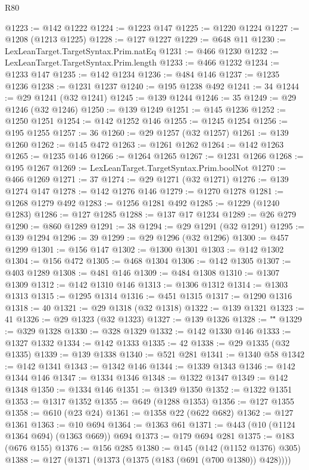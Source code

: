 \begin{lexlean}{R80}
\begin{coremodule}
@1223 := @142 @1222
@1224 := @1223 @147
@1225 := @1220 @1224
@1227 := @1208 (@1213 @1225)
@1228 := @127 @1227
@1229 := @648 @11
@1230 := LexLeanTarget.TargetSyntax.Prim.natEq
@1231 := @466 @1230
@1232 := LexLeanTarget.TargetSyntax.Prim.length
@1233 := @466 @1232
@1234 := @1233 @147
@1235 := @142 @1234
@1236 := @484 @146
@1237 := @1235 @1236
@1238 := @1231 @1237
@1240 := @195 @1238 @492
@1241 := 34
@1244 := @29 @1241 (@32 @1241)
@1245 := @139 @1244
@1246 := 35
@1249 := @29 @1246 (@32 @1246)
@1250 := @139 @1249
@1251 := @145 @1236
@1252 := @1250 @1251
@1254 := @142 @1252 @146
@1255 := @1245 @1254
@1256 := @195 @1255
@1257 := 36
@1260 := @29 @1257 (@32 @1257)
@1261 := @139 @1260
@1262 := @145 @472
@1263 := @1261 @1262
@1264 := @142 @1263
@1265 := @1235 @146
@1266 := @1264 @1265
@1267 := @1231 @1266
@1268 := @195 @1267
@1269 := LexLeanTarget.TargetSyntax.Prim.boolNot
@1270 := @466 @1269
@1271 := 37
@1274 := @29 @1271 (@32 @1271)
@1276 := @139 @1274 @147
@1278 := @142 @1276 @146
@1279 := @1270 @1278
@1281 := @1268 @1279 @492
@1283 := @1256 @1281 @492
@1285 := @1229 (@1240 @1283)
@1286 := @127 @1285
@1288 := @137 @17 @1234
@1289 := @26 @279
@1290 := @860 @1289
@1291 := 38
@1294 := @29 @1291 (@32 @1291)
@1295 := @139 @1294
@1296 := 39
@1299 := @29 @1296 (@32 @1296)
@1300 := @457 @1299
@1301 := @156 @147
@1302 := @1300 @1301
@1303 := @142 @1302
@1304 := @156 @472
@1305 := @468 @1304
@1306 := @142 @1305
@1307 := @403 @1289
@1308 := @481 @146
@1309 := @484 @1308
@1310 := @1307 @1309
@1312 := @142 @1310 @146
@1313 := @1306 @1312
@1314 := @1303 @1313
@1315 := @1295 @1314
@1316 := @451 @1315
@1317 := @1290 @1316
@1318 := 40
@1321 := @29 @1318 (@32 @1318)
@1322 := @139 @1321
@1323 := 41
@1326 := @29 @1323 (@32 @1323)
@1327 := @139 @1326
@1328 := "\""
@1329 := @329 @1328
@1330 := @328 @1329
@1332 := @142 @1330 @146
@1333 := @1327 @1332
@1334 := @142 @1333
@1335 := 42
@1338 := @29 @1335 (@32 @1335)
@1339 := @139 @1338
@1340 := @521 @281
@1341 := @1340 @58
@1342 := @142 @1341
@1343 := @1342 @146
@1344 := @1339 @1343
@1346 := @142 @1344 @146
@1347 := @1334 @1346
@1348 := @1322 @1347
@1349 := @142 @1348
@1350 := @1334 @146
@1351 := @1349 @1350
@1352 := @1322 @1351
@1353 := @1317 @1352
@1355 := @649 (@1288 @1353)
@1356 := @127 @1355
@1358 := @610 (@23 @24)
@1361 := @1358 @22 (@622 @682)
@1362 := @127 @1361
@1363 := @10 @694
@1364 := @1363 @61
@1371 := @443 (@10 (@1124 @1364 @694) (@1363 @669)) @694
@1373 := @179 @694 @281
@1375 := @183 (@676 @155)
@1376 := @156 @285
@1380 := @145 (@142 (@1152 @1376) @305)
@1388 := @127 (@1371 (@1373 (@1375 (@183 (@691 (@700 @1380)) @428))))

\end{coremodule}
\end{lexlean}
